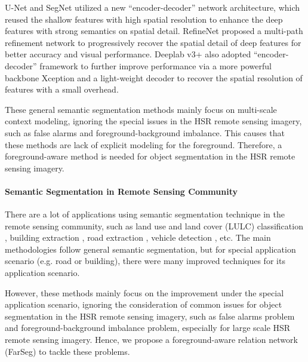 \documentclass[10pt,twocolumn,letterpaper]{article}
\begin{document}
U-Net \cite{ronneberger2015u} and SegNet \cite{badrinarayanan2017segnet} utilized a new ``encoder-decoder'' network architecture, which reused the shallow features with high spatial resolution to enhance the deep features with strong semantics on spatial detail.
RefineNet \cite{lin2017refinenet} proposed a multi-path refinement network to progressively recover the spatial detail of deep features for better accuracy and visual performance.
Deeplab v3+ also adopted ``encoder-decoder'' framework to further improve performance via a more powerful backbone Xception \cite{chollet2017xception} and a light-weight decoder to recover the spatial resolution of features with a small overhead.

These general semantic segmentation methods mainly focus on multi-scale context modeling, ignoring the special issues in the HSR remote sensing imagery, such as false alarms and foreground-background imbalance.
This causes that these methods are lack of explicit modeling for the foreground.
Therefore, a foreground-aware method is needed for object segmentation in the HSR remote sensing imagery.
\paragraph{Semantic Segmentation in Remote Sensing Community}

There are a lot of applications using semantic segmentation technique in the remote sensing community, such as land use and land cover (LULC) classification \cite{zhang2018object,huang2018urban,zhang2019joint}, building extraction \cite{yuan2017learning, ji2018fully, xu2018building,dickenson2018rotated}, road extraction \cite{liang2019convolutional,cheng2017automatic,bastani2018roadtracer,lu2019multi,batra2019improved}, vehicle detection \cite{mou2018vehicle}, etc.
The main methodologies follow general semantic segmentation, but for special application scenario (e.g. road or building), there were many improved techniques \cite{bastani2018roadtracer, dickenson2018rotated, batra2019improved} for its application scenario.

However, these methods mainly focus on the improvement under the special application scenario, ignoring the consideration of common issues for object segmentation in the HSR remote sensing imagery, such as false alarms problem and foreground-background imbalance problem, especially for large scale HSR remote sensing imagery.
Hence, we propose a foreground-aware relation network (FarSeg) to tackle these problems.
\end{document}
